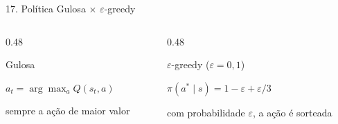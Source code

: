 \documentclass[aspectratio=169,10pt,t]{beamer}
\begin{document}
\begin{frame}{17. Política Gulosa $\times$ $\varepsilon$-greedy}

  \begin{columns}[T,onlytextwidth]
    \begin{column}{0.48\textwidth}
      \begin{block}{Gulosa}
        {\centering $\displaystyle a_t = \arg\max_a Q(s_t, a)$\par}
        \vskip 3pt
        {\centering\footnotesize sempre a ação de maior valor\par}
      \end{block}
    \end{column}

    \begin{column}{0.48\textwidth}
      \begin{block}{$\varepsilon$-greedy ($\varepsilon = 0{,}1$)}
        {\centering $\displaystyle \pi(a^* \mid s) = 1 - \varepsilon + \varepsilon/3$\par}
        \vskip 3pt
        {\centering\footnotesize com probabilidade $\varepsilon$, a ação é sorteada\par}
      \end{block}
    \end{column}
  \end{columns}

  \vskip 0.1cm


\end{frame}
\end{document}
